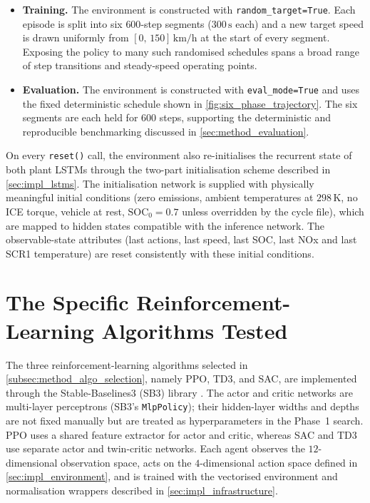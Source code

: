 \begin{itemize}
  \item \textbf{Training.} The environment is constructed with \texttt{random\_target=True}. Each episode is split into six $600$-step segments ($300\,\text{s}$ each) and a new target speed is drawn uniformly from $[0,\,150]\,\text{km/h}$ at the start of every segment. Exposing the policy to many such randomised schedules spans a broad range of step transitions and steady-speed operating points.
  \item \textbf{Evaluation.} The environment is constructed with \texttt{eval\_mode=True} and uses the fixed deterministic schedule shown in \autoref{fig:six_phase_trajectory}. The six segments are each held for $600$ steps, supporting the deterministic and reproducible benchmarking discussed in \autoref{sec:method_evaluation}.
\end{itemize}

On every \texttt{reset()} call, the environment also re-initialises the recurrent state of both plant \ac{LSTM}s through the two-part initialisation scheme described in \autoref{sec:impl_lstms}. The initialisation network is supplied with physically meaningful initial conditions (zero emissions, ambient temperatures at $298\,\text{K}$, no \ac{ICE} torque, vehicle at rest, $\mathrm{SOC}_0 = 0.7$ unless overridden by the cycle file), which are mapped to hidden states compatible with the inference network. The observable-state attributes (last actions, last speed, last \ac{SOC}, last \ac{NOx} and last SCR1 temperature) are reset consistently with these initial conditions.

\section{The Specific Reinforcement-Learning Algorithms Tested}
\label{sec:impl_algorithms}
The three reinforcement-learning algorithms selected in \autoref{subsec:method_algo_selection}, namely \ac{PPO}, \ac{TD3}, and \ac{SAC}, are implemented through the Stable-Baselines3 (SB3) library \cite{raffin_stable-baselines3_2021}. The actor and critic networks are multi-layer perceptrons (SB3's \texttt{MlpPolicy}); their hidden-layer widths and depths are not fixed manually but are treated as hyperparameters in the Phase~1 search. PPO uses a shared feature extractor for actor and critic, whereas SAC and TD3 use separate actor and twin-critic networks. Each agent observes the $12$-dimensional observation space, acts on the $4$-dimensional action space defined in \autoref{sec:impl_environment}, and is trained with the vectorised environment and normalisation wrappers described in \autoref{sec:impl_infrastructure}.

